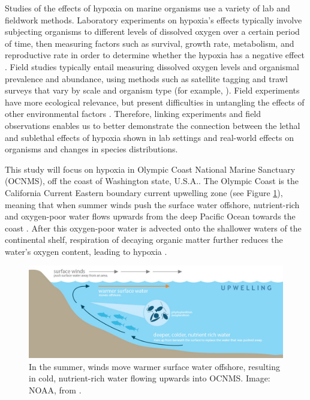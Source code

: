 \documentclass[12pt,twoside]{reedthesis}
\begin{document}
Studies of the effects of hypoxia on marine organisms use a variety of lab and fieldwork methods. Laboratory experiments on hypoxia's effects typically involve subjecting organisms to different levels of dissolved oxygen over a certain period of time, then measuring factors such as survival, growth rate, metabolism, and reproductive rate in order to determine whether the hypoxia has a negative effect \autocite{Steckbauer2020}. Field studies typically entail measuring dissolved oxygen levels and organismal prevalence and abundance, using methods such as satellite tagging and trawl surveys that vary by scale and organism type (for example, \autocite{Keister2020}). Field experiments have more ecological relevance, but present difficulties in untangling the effects of other environmental factors \autocite{Borges2022, Boyd2018}. Therefore, linking experiments and field observations enables us to better demonstrate the connection between the lethal and sublethal effects of hypoxia shown in lab settings and real-world effects on organisms and changes in species distributions.

This study will focus on hypoxia in Olympic Coast National Marine Sanctuary (OCNMS), off the coast of Washington state, U.S.A.. The Olympic Coast is the California Current Eastern boundary current upwelling zone (see Figure \ref{Upwelling}), meaning that when summer winds push the surface water offshore, nutrient-rich and oxygen-poor water flows upwards from the deep Pacific Ocean towards the coast \autocite{OceanographyOlympicCoast, Hickey2003}. After this oxygen-poor water is advected onto the shallower waters of the continental shelf, respiration of decaying organic matter further reduces the water's oxygen content, leading to hypoxia \autocite{Pierce2012}. 

\begin{figure}[!h]
	\begin{center}
		\includegraphics[scale=0.4]{Fig_NOAA_Upwelling}
		\caption[Upwelling]{\footnotesize{In the summer, winds move warmer surface water offshore, resulting in cold, nutrient-rich water flowing upwards into OCNMS. Image: NOAA, from \autocite{OceanographyOlympicCoast}.}} %
		\label{Upwelling}
	\end{center}
\end{figure} 
\end{document}
